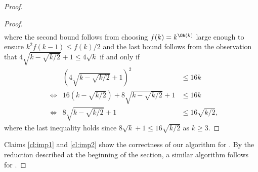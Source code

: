 \begin{proof}
\begin{proof}
\begin{align*}
  \end{align*}
 where the second bound follows from choosing $f(k) = k^{\Oh(k)}$ large enough to ensure $k^2f(k-1) \le f(k)/2$ and 
 the last bound follows from the observation that $4\sqrt{k-\sqrt{k/2}} + 1\le 4\sqrt{k}$ if and only if 
   \begin{align*}
& &  \left(4\sqrt{k-\sqrt{k/2}} + 1\right)^2 & \le 16k\\
& \iff & 16(k-\sqrt{k/2}) + 8\sqrt{k-\sqrt{k/2}} + 1 & \le 16k\\
& \iff & 8\sqrt{k-\sqrt{k/2}} + 1 & \le 16\sqrt{k/2},
  \end{align*}
  where the last inequality holds since $8\sqrt{k}+1 \le 16\sqrt{k/2}$ as $k\ge 3$.
  \cqed\end{proof}
Claims \ref{cl:imp1} and \ref{cl:imp2} show the correctness of our algorithm for \wDAGImplication. By the reduction described at the beginning of the section, a similar algorithm follows for \Implication.
\end{proof}
